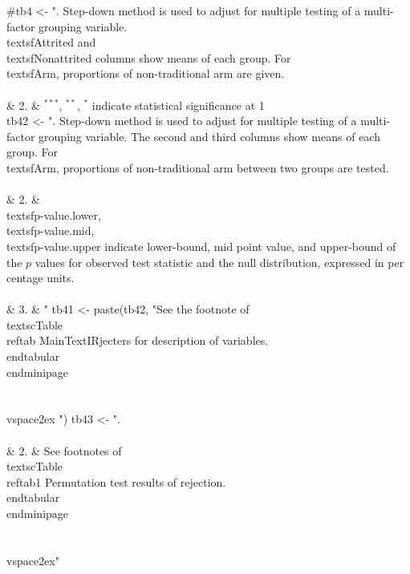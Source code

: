 \begin{Schunk}
\begin{Sinput}
#tb4 <- ". Step-down method is used to adjust for multiple testing of a multi-factor grouping variable. \\textsf{Attrited} and \\textsf{Nonattrited} columns show means of each group. For \\textsf{Arm}, proportions of non-traditional arm are given. \\\\& 2. & ${}^{***}$, ${}^{**}$, ${}^{*}$ indicate statistical significance at 1\\%
tb42 <- ". Step-down method is used to adjust for multiple testing of a multi-factor grouping variable. The second and third columns show means of each group. For \\textsf{Arm}, proportions of non-traditional arm between two groups are tested. \\\\& 2. & \\textsf{p-value.lower}, \\textsf{p-value.mid}, \\textsf{p-value.upper} indicate lower-bound, mid point value, and upper-bound of the $p$ values for observed test statistic and the null distribution, expressed in per centage units. \\\\& 3. & "
tb41 <- paste(tb42, "See the footnote of \\textsc{Table \\ref{tab MainTextIRjecters}} for description of variables. \\end{tabular}\\end{minipage}\\\\\\vspace{2ex} ")
tb43 <- ".\\\\& 2. &  See footnotes of \\textsc{Table \\ref{tab1 Permutation test results of rejection}}. \\end{tabular}\\end{minipage}\\\\\\vspace{2ex}"

\end{Sinput}
\end{Schunk}
